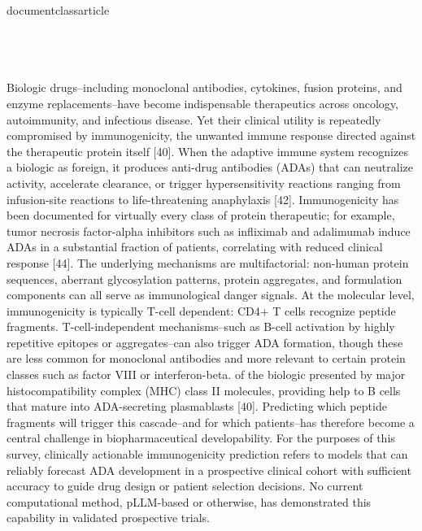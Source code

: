 \\documentclass{article}
\begin{document}
\subsection{}

Biologic drugs--including monoclonal antibodies, cytokines, fusion proteins, and enzyme replacements--have become indispensable therapeutics across oncology, autoimmunity, and infectious disease. Yet their clinical utility is repeatedly compromised by immunogenicity, the unwanted immune response directed against the therapeutic protein itself [40]. When the adaptive immune system recognizes a biologic as foreign, it produces anti-drug antibodies (ADAs) that can neutralize activity, accelerate clearance, or trigger hypersensitivity reactions ranging from infusion-site reactions to life-threatening anaphylaxis [42]. Immunogenicity has been documented for virtually every class of protein therapeutic; for example, tumor necrosis factor-alpha inhibitors such as infliximab and adalimumab induce ADAs in a substantial fraction of patients, correlating with reduced clinical response [44]. The underlying mechanisms are multifactorial: non-human protein sequences, aberrant glycosylation patterns, protein aggregates, and formulation components can all serve as immunological danger signals. At the molecular level, immunogenicity is typically T-cell dependent: CD4+ T cells recognize peptide fragments. T-cell-independent mechanisms--such as B-cell activation by highly repetitive epitopes or aggregates--can also trigger ADA formation, though these are less common for monoclonal antibodies and more relevant to certain protein classes such as factor VIII or interferon-beta. of the biologic presented by major histocompatibility complex (MHC) class II molecules, providing help to B cells that mature into ADA-secreting plasmablasts [40]. Predicting which peptide fragments will trigger this cascade--and for which patients--has therefore become a central challenge in biopharmaceutical developability. For the purposes of this survey, clinically actionable immunogenicity prediction refers to models that can reliably forecast ADA development in a prospective clinical cohort with sufficient accuracy to guide drug design or patient selection decisions. No current computational method, pLLM-based or otherwise, has demonstrated this capability in validated prospective trials.

\subsection{}
\end{document}
